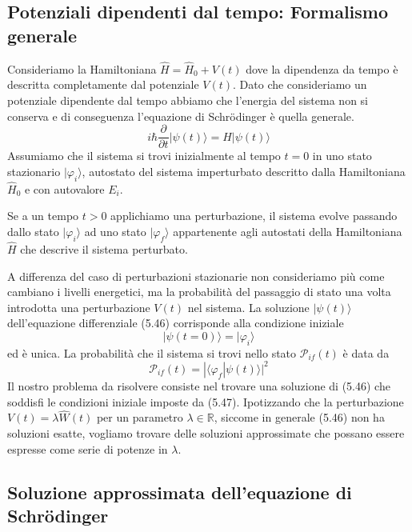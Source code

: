 \subsection{Potenziali dipendenti dal tempo: Formalismo generale}

Consideriamo la Hamiltoniana $\hat{H} = \hat{H}_0 + V(t)$ dove la dipendenza da tempo \`e descritta completamente dal potenziale $V(t)$. Dato che consideriamo un potenziale dipendente dal tempo abbiamo che l'energia del sistema non si conserva e di conseguenza l'equazione di Schr\"odinger \`e quella generale.
\begin{equation}
	i \hbar \frac{\partial }{\partial t}|\psi(t) \rangle = H |\psi(t) \rangle 
\end{equation}
Assumiamo che il sistema si trovi inizialmente al tempo $t=0$ in uno stato stazionario $|\varphi_i \rangle $, autostato del sistema imperturbato descritto dalla Hamiltoniana $\hat{H}_0$ e con autovalore $E_i$. 
\newpage 

Se a un tempo $t > 0$ applichiamo una perturbazione, il sistema evolve passando dallo stato $|\varphi_i \rangle $ ad uno stato $|\varphi_f \rangle $ appartenente agli autostati della Hamiltoniana $\hat{H}$ che descrive il sistema perturbato.

A differenza del caso di perturbazioni stazionarie non consideriamo pi\`u come cambiano i livelli energetici, ma la probabilit\`a del passaggio di stato una volta introdotta una perturbazione $V(t)$ nel sistema.
La soluzione $|\psi(t) \rangle$ dell'equazione differenziale (5.46) corrisponde alla condizione iniziale 
\begin{equation}
	|\psi(t=0) \rangle = | \varphi_i \rangle 
\end{equation}
ed \`e unica. La probabilit\`a che il sistema si trovi nello stato $\mathcal{P}_{if}(t)$ \`e data da
\begin{equation*}
	\mathcal{P}_{if}(t) = |\langle \varphi_f|\psi(t) \rangle|^2
\end{equation*}
Il nostro problema da risolvere consiste nel trovare una soluzione di (5.46) che soddisfi le condizioni iniziale imposte da (5.47). Ipotizzando che la perturbazione $V(t) = \lambda \hat{W}(t)$ per un parametro $\lambda \in \mathbb{R}$, siccome in generale (5.46) non ha soluzioni esatte, vogliamo trovare delle soluzioni approssimate che possano essere espresse come serie di potenze in $\lambda$.

\subsection{Soluzione approssimata dell'equazione di Schr\"odinger}

